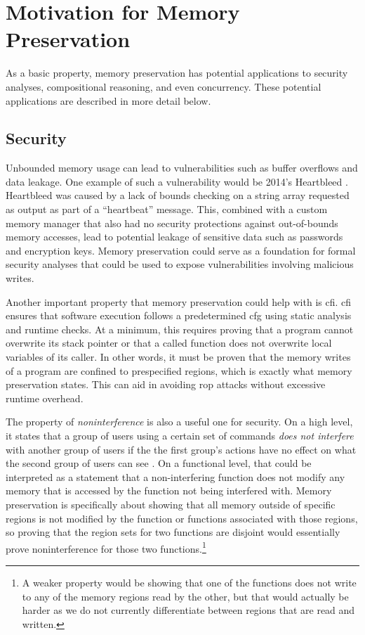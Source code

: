 \section{Motivation for Memory Preservation}
As a basic property, memory preservation has potential applications to security analyses, compositional reasoning, and even concurrency.
These potential applications are described in more detail below.

\subsection{Security}
Unbounded memory usage can lead to vulnerabilities
such as buffer overflows and data leakage.
One example of such a vulnerability would be 2014's Heartbleed \autocite{heartbleed}.
Heartbleed was caused by a lack of bounds checking on a string array
requested as output as part of a ``heartbeat'' message.
This, combined with a custom memory manager
that also had no security protections against out-of-bounds memory accesses,
lead to potential leakage of sensitive data such as passwords and encryption keys.
Memory preservation could serve as a foundation for formal security analyses
that could be used to expose vulnerabilities involving malicious writes.

Another important property that memory preservation could help with
is \ac{cfi}. \Ac{cfi} ensures that software execution
follows a predetermined \ac{cfg} using static analysis and runtime checks.
At a minimum, this requires proving that a program cannot overwrite its stack pointer
or that a called function does not overwrite local variables of its caller.
In other words, it must be proven that the memory writes of a program
are confined to prespecified regions, which is exactly what memory preservation states.
This can aid in avoiding \ac{rop} attacks without excessive runtime overhead.

The property of \emph{noninterference} is also a useful one for security.
On a high level, it states that a group of users using a certain set of commands
\emph{does not interfere} with another group of users if the the first group's actions
have no effect on what the second group of users can see
\autocite{goguen1982security,rushby1992noninterference}.
On a functional level, that could be interpreted as a statement that a non-interfering function does not modify any memory that is accessed
by the function not being interfered with.
Memory preservation is specifically about showing that all memory outside of
specific regions is not modified by the function
or functions associated with those regions, so proving that the region sets
for two functions are disjoint
would essentially prove noninterference for those two functions.\footnote{%
  A weaker property would be showing that one of the functions does not write
  to any of the memory regions read by the other, but that would actually be harder
  as we do not currently differentiate between regions that are read and written.%
}

